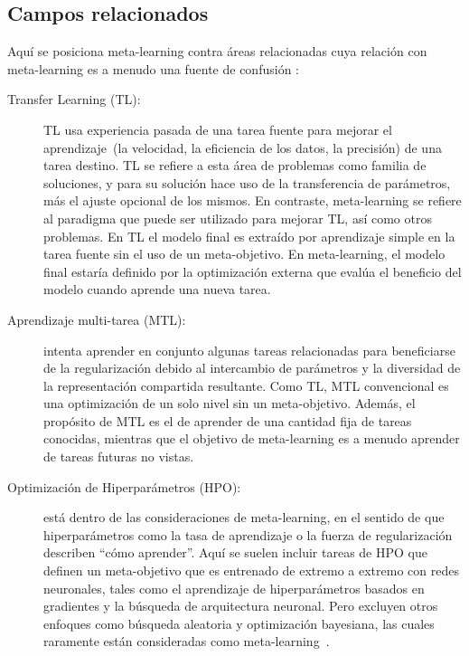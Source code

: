 \subsection{Campos relacionados}\label{subsec:meta-related-fields}

Aquí se posiciona meta-learning contra áreas relacionadas cuya relación con
meta-learning es a menudo una fuente de confusión
:

\begin{description}
	\item[Transfer Learning (TL):] TL usa experiencia pasada de una tarea
    fuente para mejorar el aprendizaje~(la velocidad, la eficiencia de los
    datos, la precisión) de una tarea destino. TL se refiere a esta área de
    problemas como familia de soluciones, y para su solución hace uso de la
    transferencia de parámetros, más el ajuste opcional de los mismos. En
    contraste, meta-learning se refiere al paradigma que puede ser utilizado
    para mejorar TL, así como otros problemas. En TL el modelo final es
    extraído por aprendizaje simple en la tarea fuente sin el uso de un
    meta-objetivo. En meta-learning, el modelo final estaría definido por la
    optimización externa que evalúa el beneficio del modelo cuando aprende una
    nueva tarea.
	
	\item[Aprendizaje multi-tarea (MTL):] intenta aprender en conjunto algunas
    tareas relacionadas para beneficiarse de la regularización debido al
    intercambio de parámetros y la diversidad de la representación compartida
    resultante. Como TL, MTL convencional es una optimización de un solo nivel
    sin un meta-objetivo. Además, el propósito de MTL es el de aprender de una
    cantidad fija de tareas conocidas, mientras que el objetivo de
    meta-learning es a menudo aprender de tareas futuras no vistas.
	 
	\item[Optimización de Hiperparámetros (HPO):] está dentro de las
    consideraciones de meta-learning, en el sentido de que hiperparámetros como
    la tasa de aprendizaje o la fuerza de regularización describen
    ``cómo aprender''. Aquí se suelen incluir tareas de HPO que definen un
    meta-objetivo que es entrenado de extremo a extremo con redes neuronales,
    tales como el aprendizaje de hiperparámetros basados en gradientes y la
    búsqueda de arquitectura neuronal. Pero excluyen otros enfoques como
    búsqueda aleatoria y optimización bayesiana, las cuales raramente están
    consideradas como meta-learning~.
	

\end{description}
